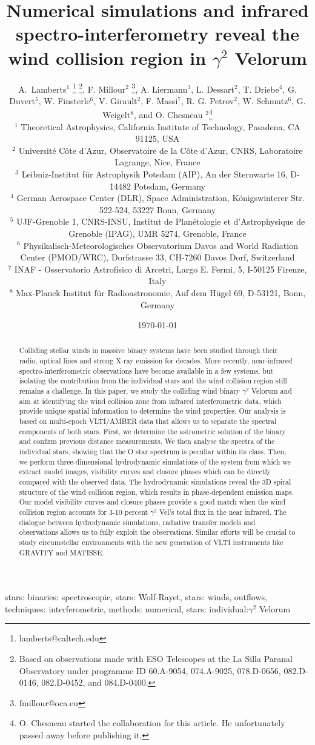 \documentclass[usenatbib]{mnras}%
\title[interferometry and hydrodynamics in $\gamma^2$ Vel]{Numerical simulations and infrared spectro-interferometry reveal the wind collision region in $\gamma^2$ Velorum}
\author[Lamberts et al.]{A.~Lamberts$^{1}$ \thanks{lamberts@caltech.edu} \thanks{Based on observations made with ESO Telescopes at the La Silla Paranal Observatory under programme ID 60.A-9054, 074.A-9025, 078.D-0656, 082.D-0146, 082.D-0452, and 084.D-0400.},
F. Millour$^{2}$ \thanks{fmillour@oca.eu},
A. Liermann$^3$,
L. Dessart$^{2}$,
T. Driebe$^4$,
G. Duvert$^{5}$,
\newauthor W. Finsterle$^{6}$,
V. Girault$^{2}$,
F. Massi$^7$,
R. G. Petrov$^2$,
W. Schmutz$^6$,
G. Weigelt$^8$,
\newauthor and O. Chesneau $^{2}$\thanks{ O. Chesneau started the collaboration for this article. He unfortunately passed away before publishing it.}\\
$^{1}$ Theoretical Astrophysics, California Institute of Technology, Pasadena, CA 91125, USA\\
$^2$ Universit\'e C\^ote d'Azur, Observatoire de la C\^ote d'Azur, CNRS, Laboratoire Lagrange, Nice, France\\
$^3$ Leibniz-Institut f\"ur Astrophysik Potsdam (AIP), An der Sternwarte 16, D-14482 Potsdam, Germany\\
$^4$ German Aerospace Center (DLR), Space Administration,  Königswinterer Str. 522-524, 53227 Bonn, Germany\\
$^5$ UJF-Grenoble 1, CNRS-INSU, Institut de Plan\'etologie et d'Astrophysique de Grenoble (IPAG), UMR 5274, Grenoble, France\\
$^6$  Physikalisch-Meteorologisches Observatorium Davos and World Radiation Center (PMOD/WRC), Dorfstrasse 33, CH-7260 Davos Dorf, Switzerland\\
$^7$ INAF - Osservatorio Astrofisico di Arcetri, Largo E. Fermi, 5, I-50125 Firenze, Italy\\
$^8$ Max-Planck Institut f\"ur Radioastronomie, Auf dem H\"ugel 69, D-53121, Bonn, Germany
 }
\begin{document}
\date{\today}%

\pagerange{\pageref{firstpage}--\pageref{lastpage}} 

\maketitle

\label{firstpage}

\begin{abstract}
Colliding stellar winds in massive binary systems have been studied through their radio, optical lines and strong X-ray emission for decades. More recently, near-infrared spectro-interferometric observations have become available in a few systems, but isolating the contribution from the individual stars and the wind collision region still remains a challenge. In this paper, we study the colliding wind binary $\gamma^2$ Velorum and aim at identifying the wind collision zone from infrared interferometric data, which provide unique spatial information to determine the wind properties. Our analysis is based on multi-epoch VLTI/AMBER data that allows us to separate the spectral components of both stars.  First, we determine the astrometric solution of the binary and confirm previous distance measurements. We then analyse the spectra of the individual stars, showing that the O star spectrum is peculiar within its class. Then, we perform three-dimensional hydrodynamic simulations of the system from which we extract model images, visibility curves and closure phases which can be directly compared with the observed data. The hydrodynamic simulations reveal the 3D spiral structure of the wind collision region, which results in phase-dependent emission maps. Our model visibility curves and closure phases provide a good match when the wind collision region accounts for 3-10 percent $\gamma^2$ Vel's total flux in the near infrared. The dialogue between hydrodynamic simulations, radiative transfer models and observations allows us to fully exploit the observations. Similar efforts will be crucial to study circumstellar environments with the new generation of VLTI instruments like GRAVITY and MATISSE. 
\end{abstract}

\begin{keywords}
stars: binaries: spectroscopic, stars: Wolf-Rayet, stars: winds, outflows, techniques: interferometric, methods: numerical,  stars: individual:$\gamma^2$ Velorum
\end{keywords}
\end{document}
